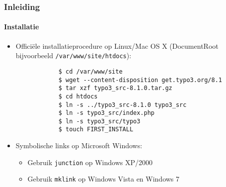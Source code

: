 \begin{frame}[fragile]
	\frametitle{Inleiding}
	\framesubtitle{Installatie}

	\begin{itemize}
		\item Officiële installatieprocedure op Linux/Mac OS X\newline
			(DocumentRoot bijvoorbeeld \texttt{/var/www/site/htdocs}):
		\begin{lstlisting}
			$ cd /var/www/site
			$ wget --content-disposition get.typo3.org/8.1
			$ tar xzf typo3_src-8.1.0.tar.gz
			$ cd htdocs
			$ ln -s ../typo3_src-8.1.0 typo3_src
			$ ln -s typo3_src/index.php
			$ ln -s typo3_src/typo3
			$ touch FIRST_INSTALL
		\end{lstlisting}

		\item Symbolische links op Microsoft Windows:

			\begin{itemize}
				\item Gebruik \texttt{junction} op Windows XP/2000
				\item Gebruik \texttt{mklink} op Windows Vista en Windows 7
			\end{itemize}

	\end{itemize}
\end{frame}

